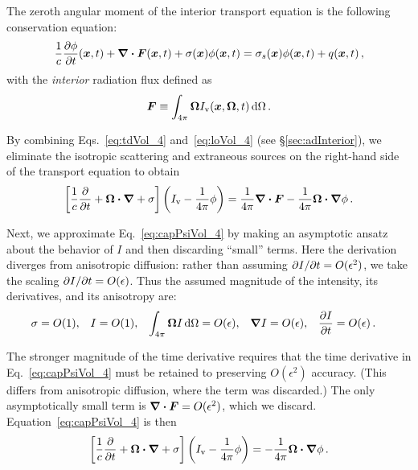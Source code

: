 The zeroth angular moment of the interior transport equation is the following
conservation equation:
\begin{equation} \label{eq:loVol_4}
\frac{1}{c} \frac{\partial \phi}{\partial t} (\bm{x}, t)
  + \bm{\nabla} \bm{\cdot}\bm{F}(\bm{x}, t)
  + \sigma(\bm{x}) \phi(\bm{x}, t)
 = \sigma_s(\bm{x}) \phi(\bm{x},t) + q(\bm{x},t)\,,
\end{equation}
with the \emph{interior} radiation flux defined as
\begin{equation}\label{eq:tdF_4}
  \bm{F} \equiv \int_{4\pi} \bm{\Omega} I_\mathrm{v}(\bm{x}, \bm{\Omega},t) \mathop{}\!\mathrm{d}
  \Omega\,.
\end{equation}

By combining Eqs.~\eqref{eq:tdVol_4} and~\eqref{eq:loVol_4} (see
\S\ref{sec:adInterior}), we eliminate the isotropic scattering and extraneous
sources on
the right-hand side of the transport equation to obtain
\begin{equation}\label{eq:capPsiVol_4}
  \left[ \frac{1}{c}\frac{\partial }{\partial t}
  + \bm{\Omega}\bm{\cdot} \bm{\nabla}
  + \sigma \right]
   \left( I_\mathrm{v}
  - \frac{1}{4\pi} \phi \right)
  = \frac{1}{4\pi} \bm{\nabla} \bm{\cdot}\bm{F} -
  \frac{1}{4\pi} \bm{\Omega}\bm{\cdot} \bm{\nabla} \phi\,.
\end{equation}

Next, we approximate Eq.~\eqref{eq:capPsiVol_4} by making an asymptotic ansatz
about the behavior of $I$ and then discarding ``small'' terms. Here the
derivation diverges from anisotropic diffusion: rather than assuming
${\partial I}/{\partial t} = O(\epsilon^2)$, we take the scaling ${\partial I}/{\partial t} =
O(\epsilon)$. Thus the assumed magnitude of the intensity, its derivatives, and
its anisotropy are:
\begin{align} \label{eq:ap1ansatz}
  \sigma &= O(1), &
  I &= O(1), &
  \int_{4\pi} \bm{\Omega} I \mathop{}\!\mathrm{d}\Omega &= O(\epsilon), &
  \bm{\nabla} I &= O(\epsilon), &
  \frac{\partial I}{\partial t} &= O(\epsilon) \,.
\end{align}

The stronger magnitude of the time derivative requires that the time derivative
in Eq.~\eqref{eq:capPsiVol_4} must be retained to preserving $O(\epsilon^2)$
accuracy. (This differs from anisotropic diffusion, where the term was
discarded.) The only asymptotically
small term is $\bm{\nabla} \bm{\cdot}\bm{F} = O(\epsilon^2)$, which we discard.
Equation~\eqref{eq:capPsiVol_4} is then
\begin{equation*}
  \left[ \frac{1}{c}\frac{\partial }{\partial t}
  + \bm{\Omega}\bm{\cdot} \bm{\nabla}
  + \sigma \right]
   \left( I_\mathrm{v} - \frac{1}{4\pi} \phi \right)
  = - \frac{1}{4\pi} \bm{\Omega}\bm{\cdot} \bm{\nabla} \phi\,.
\end{equation*}

